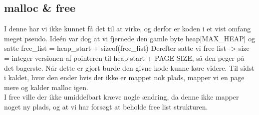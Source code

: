 \documentclass[a4paper,12pt]{article}
\begin{document}
\subsection*{malloc \& free}
I denne har vi ikke kunnet få det til at virke, og derfor er koden i et vist 
omfang meget pseudo. 
Ideén var dog at vi fjernede den gamle byte heap[MAX\_HEAP] og satte free\_list
= heap\_start + sizeof(free\_list)
Derefter satte vi free list -> size = integer versionen af pointeren til 
heap start + PAGE SIZE, så den peger på det bagerste.
Når dette er gjort burde den givne kode kunne køre videre.
Til sidst i kaldet, hvor den ender hvis der ikke er mappet nok plads, mapper vi
en page mere og kalder malloc igen.
\\
I free ville der ikke umiddelbart kræve nogle ændring, da denne ikke mapper noget ny plads, og at vi har forsøgt at beholde free list strukturen.
\end{document}
